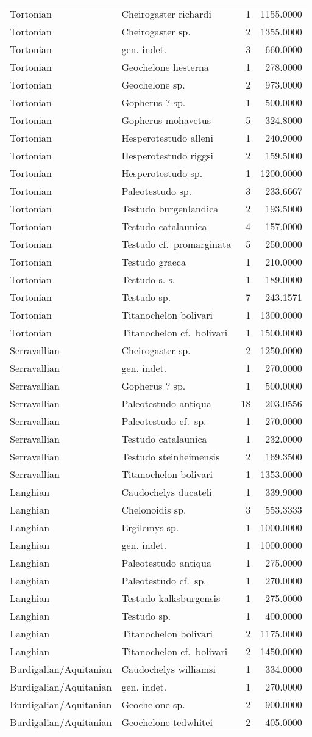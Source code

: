\begin{longtable}[]{@{}llrr@{}}
	Tortonian & Cheirogaster richardi & 1 & 1155.0000\tabularnewline
	Tortonian & Cheirogaster sp. & 2 & 1355.0000\tabularnewline
	Tortonian & gen. indet. & 3 & 660.0000\tabularnewline
	Tortonian & Geochelone hesterna & 1 & 278.0000\tabularnewline
	Tortonian & Geochelone sp. & 2 & 973.0000\tabularnewline
	Tortonian & Gopherus ? sp. & 1 & 500.0000\tabularnewline
	Tortonian & Gopherus mohavetus & 5 & 324.8000\tabularnewline
	Tortonian & Hesperotestudo alleni & 1 & 240.9000\tabularnewline
	Tortonian & Hesperotestudo riggsi & 2 & 159.5000\tabularnewline
	Tortonian & Hesperotestudo sp. & 1 & 1200.0000\tabularnewline
	Tortonian & Paleotestudo sp. & 3 & 233.6667\tabularnewline
	Tortonian & Testudo burgenlandica & 2 & 193.5000\tabularnewline
	Tortonian & Testudo catalaunica & 4 & 157.0000\tabularnewline
	Tortonian & Testudo cf.~promarginata & 5 & 250.0000\tabularnewline
	Tortonian & Testudo graeca & 1 & 210.0000\tabularnewline
	Tortonian & Testudo s. s. & 1 & 189.0000\tabularnewline
	Tortonian & Testudo sp. & 7 & 243.1571\tabularnewline
	Tortonian & Titanochelon bolivari & 1 & 1300.0000\tabularnewline
	Tortonian & Titanochelon cf.~bolivari & 1 & 1500.0000\tabularnewline
	Serravallian & Cheirogaster sp. & 2 & 1250.0000\tabularnewline
	Serravallian & gen. indet. & 1 & 270.0000\tabularnewline
	Serravallian & Gopherus ? sp. & 1 & 500.0000\tabularnewline
	Serravallian & Paleotestudo antiqua & 18 & 203.0556\tabularnewline
	Serravallian & Paleotestudo cf.~sp. & 1 & 270.0000\tabularnewline
	Serravallian & Testudo catalaunica & 1 & 232.0000\tabularnewline
	Serravallian & Testudo steinheimensis & 2 & 169.3500\tabularnewline
	Serravallian & Titanochelon bolivari & 1 & 1353.0000\tabularnewline
	Langhian & Caudochelys ducateli & 1 & 339.9000\tabularnewline
	Langhian & Chelonoidis sp. & 3 & 553.3333\tabularnewline
	Langhian & Ergilemys sp. & 1 & 1000.0000\tabularnewline
	Langhian & gen. indet. & 1 & 1000.0000\tabularnewline
	Langhian & Paleotestudo antiqua & 1 & 275.0000\tabularnewline
	Langhian & Paleotestudo cf.~sp. & 1 & 270.0000\tabularnewline
	Langhian & Testudo kalksburgensis & 1 & 275.0000\tabularnewline
	Langhian & Testudo sp. & 1 & 400.0000\tabularnewline
	Langhian & Titanochelon bolivari & 2 & 1175.0000\tabularnewline
	Langhian & Titanochelon cf.~bolivari & 2 & 1450.0000\tabularnewline
	Burdigalian/Aquitanian & Caudochelys williamsi & 1 &
	334.0000\tabularnewline
	Burdigalian/Aquitanian & gen. indet. & 1 & 270.0000\tabularnewline
	Burdigalian/Aquitanian & Geochelone sp. & 2 & 900.0000\tabularnewline
	Burdigalian/Aquitanian & Geochelone tedwhitei & 2 &
	405.0000\tabularnewline

\end{longtable}
